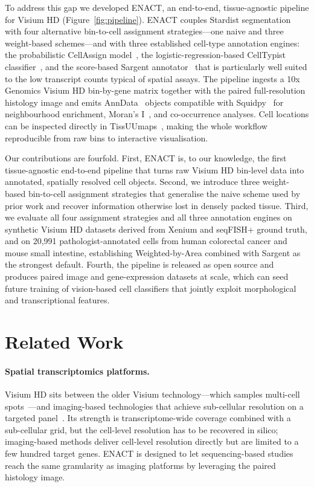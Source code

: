 \documentclass[11pt]{article}
\begin{document}
To address this gap we developed ENACT, an end-to-end, tissue-agnostic pipeline for Visium HD (Figure~\ref{fig:pipeline}). ENACT couples Stardist segmentation with four alternative bin-to-cell assignment strategies---one naive and three weight-based schemes---and with three established cell-type annotation engines: the probabilistic CellAssign model~\cite{zhang2019probabilistic}, the logistic-regression-based CellTypist classifier~\cite{conde2022celltypist}, and the score-based Sargent annotator~\cite{nouri2024sargent} that is particularly well suited to the low transcript counts typical of spatial assays. The pipeline ingests a 10x Genomics Visium HD bin-by-gene matrix together with the paired full-resolution histology image and emits AnnData~\cite{virshup2024anndata} objects compatible with Squidpy~\cite{palla2022squidpy} for neighbourhood enrichment, Moran's I~\cite{moran1950notes}, and co-occurrence analyses. Cell locations can be inspected directly in TissUUmaps~\cite{pielawski2023tissuumaps}, making the whole workflow reproducible from raw bins to interactive visualisation.

Our contributions are fourfold. First, ENACT is, to our knowledge, the first tissue-agnostic end-to-end pipeline that turns raw Visium HD bin-level data into annotated, spatially resolved cell objects. Second, we introduce three weight-based bin-to-cell assignment strategies that generalise the naive scheme used by prior work and recover information otherwise lost in densely packed tissue. Third, we evaluate all four assignment strategies and all three annotation engines on synthetic Visium HD datasets derived from Xenium and seqFISH+ ground truth, and on 20{,}991 pathologist-annotated cells from human colorectal cancer and mouse small intestine, establishing Weighted-by-Area combined with Sargent as the strongest default. Fourth, the pipeline is released as open source and produces paired image and gene-expression datasets at scale, which can seed future training of vision-based cell classifiers that jointly exploit morphological and transcriptional features.

\section{Related Work}

\paragraph{Spatial transcriptomics platforms.}
Visium HD sits between the older Visium technology---which samples multi-cell spots~\cite{stahl2016spatialtranscriptomics}---and imaging-based technologies that achieve sub-cellular resolution on a targeted panel~\cite{chen2015merfish,moffitt2018merfish,eng2019transcriptome,janesick2023xenium,rao2021xenium}. Its strength is transcriptome-wide coverage combined with a sub-cellular grid, but the cell-level resolution has to be recovered in silico; imaging-based methods deliver cell-level resolution directly but are limited to a few hundred target genes. ENACT is designed to let sequencing-based studies reach the same granularity as imaging platforms by leveraging the paired histology image.
\end{document}
